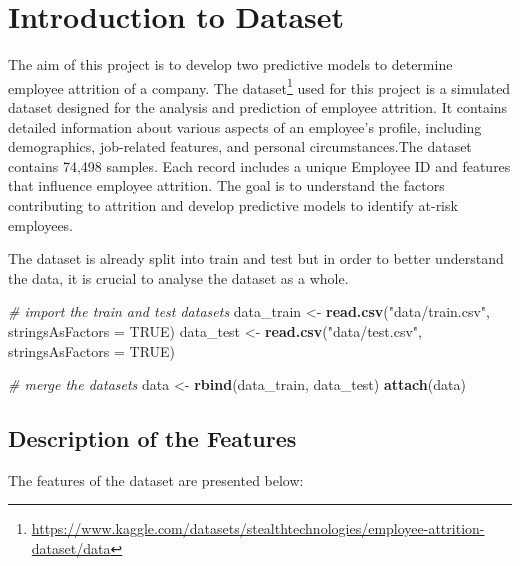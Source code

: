 \documentclass[
  10pt,
  paper=a4,
  ,captions=tableheading
]{scrartcl}
\newenvironment{Shaded}{\begin{snugshade}}{\end{snugshade}}
\newcommand{\AttributeTok}[1]{\textcolor[rgb]{0.13,0.29,0.53}{#1}}
\newcommand{\CommentTok}[1]{\textcolor[rgb]{0.56,0.35,0.01}{\textit{#1}}}
\newcommand{\ConstantTok}[1]{\textcolor[rgb]{0.56,0.35,0.01}{#1}}
\newcommand{\FunctionTok}[1]{\textcolor[rgb]{0.13,0.29,0.53}{\textbf{#1}}}
\newcommand{\NormalTok}[1]{#1}
\newcommand{\OtherTok}[1]{\textcolor[rgb]{0.56,0.35,0.01}{#1}}
\newcommand{\StringTok}[1]{\textcolor[rgb]{0.31,0.60,0.02}{#1}}
\begin{document}
{
\hypersetup{linkcolor=}
\setcounter{tocdepth}{3}
\tableofcontents
\newpage
}
\section{Introduction to Dataset}\label{introduction-to-dataset}

The aim of this project is to develop two predictive models to determine
employee attrition of a company. The dataset\footnote{\url{https://www.kaggle.com/datasets/stealthtechnologies/employee-attrition-dataset/data}}
used for this project is a simulated dataset designed for the analysis
and prediction of employee attrition. It contains detailed information
about various aspects of an employee's profile, including demographics,
job-related features, and personal circumstances.The dataset contains
74,498 samples. Each record includes a unique Employee ID and features
that influence employee attrition. The goal is to understand the factors
contributing to attrition and develop predictive models to identify
at-risk employees.

The dataset is already split into train and test but in order to better
understand the data, it is crucial to analyse the dataset as a whole.

\small

\begin{Shaded}
\begin{Highlighting}[]
\CommentTok{\# import the train and test datasets}
\NormalTok{data\_train }\OtherTok{\textless{}{-}} \FunctionTok{read.csv}\NormalTok{(}\StringTok{"data/train.csv"}\NormalTok{, }\AttributeTok{stringsAsFactors =} \ConstantTok{TRUE}\NormalTok{)}
\NormalTok{data\_test }\OtherTok{\textless{}{-}} \FunctionTok{read.csv}\NormalTok{(}\StringTok{"data/test.csv"}\NormalTok{, }\AttributeTok{stringsAsFactors =} \ConstantTok{TRUE}\NormalTok{)}

\CommentTok{\# merge the datasets}
\NormalTok{data }\OtherTok{\textless{}{-}} \FunctionTok{rbind}\NormalTok{(data\_train, data\_test)}
\FunctionTok{attach}\NormalTok{(data)}
\end{Highlighting}
\end{Shaded}

\small

\subsection{Description of the
Features}\label{description-of-the-features}

The features of the dataset are presented below:
\end{document}
